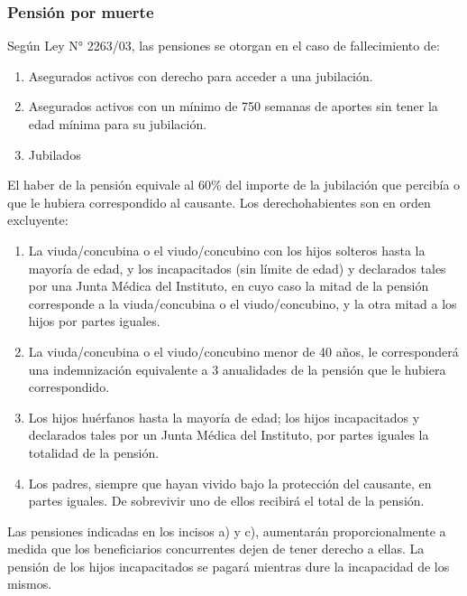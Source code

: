 \subsubsection{Pensión por muerte}

Según Ley N° 2263/03, las pensiones se otorgan en el caso de fallecimiento de:

\begin{enumerate}[label=\alph*.]

\item Asegurados activos con derecho para acceder a una jubilación.

\item Asegurados activos con un mínimo de 750 semanas de aportes sin tener la edad mínima para su jubilación. 

\item Jubilados

\end{enumerate}

El haber de la pensión equivale al 60\% del importe de la jubilación que percibía o que le hubiera correspondido al causante. Los derechohabientes son en orden excluyente: 

\begin{enumerate}[label=\alph*.]

\item La viuda/concubina o el viudo/concubino con los hijos solteros hasta la mayoría de edad, y los incapacitados (sin límite de edad) y declarados tales por una Junta Médica del Instituto, en cuyo caso la mitad de la pensión corresponde a la viuda/concubina o el viudo/concubino, y la otra mitad a los hijos por partes iguales.

\item La viuda/concubina o el viudo/concubino menor de 40 años, le corresponderá una indemnización equivalente a 3 anualidades de la pensión que le hubiera correspondido. 

\item Los hijos huérfanos hasta la mayoría de edad; los hijos incapacitados y declarados tales por un Junta Médica del Instituto, por partes iguales la totalidad de la pensión. 

\item Los padres, siempre que hayan vivido bajo la protección del causante, en partes iguales. De sobrevivir uno de ellos recibirá el total de la pensión.

\end{enumerate}

Las pensiones indicadas en los incisos a) y c), aumentarán proporcionalmente a medida que los beneficiarios concurrentes dejen de tener derecho a ellas. La pensión de los hijos incapacitados se pagará mientras dure la incapacidad de los mismos.

